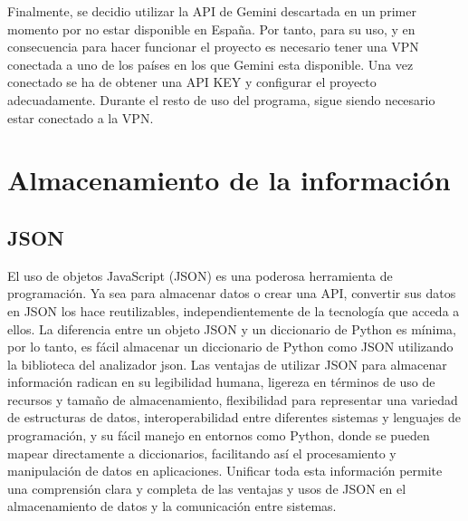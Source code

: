 Finalmente, se decidio utilizar la API de Gemini descartada en un primer momento por no estar disponible en España. Por tanto, para su uso, y en consecuencia para hacer funcionar el proyecto es necesario tener una VPN conectada a uno de los países en los que Gemini esta disponible. Una vez conectado se ha de obtener una API KEY y configurar el proyecto adecuadamente. Durante el resto de uso del programa, sigue siendo necesario estar conectado a la VPN.







\section{Almacenamiento de la información}	
\subsection{JSON}
El uso de objetos JavaScript (JSON) es una poderosa herramienta de programación. Ya sea para almacenar datos o crear una API, convertir sus datos en JSON los hace reutilizables, independientemente de la tecnología que acceda a ellos. La diferencia entre un objeto JSON y un diccionario de Python es mínima, por lo tanto, es fácil almacenar un diccionario de Python como JSON utilizando la biblioteca del analizador json. Las ventajas de utilizar JSON para almacenar información radican en su legibilidad humana, ligereza en términos de uso de recursos y tamaño de almacenamiento, flexibilidad para representar una variedad de estructuras de datos, interoperabilidad entre diferentes sistemas y lenguajes de programación, y su fácil manejo en entornos como Python, donde se pueden mapear directamente a diccionarios, facilitando así el procesamiento y manipulación de datos en aplicaciones. Unificar toda esta información permite una comprensión clara y completa de las ventajas y usos de JSON en el almacenamiento de datos y la comunicación entre sistemas.

